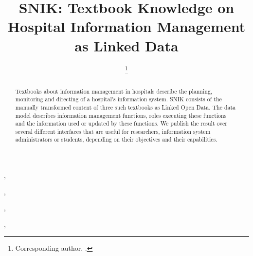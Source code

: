 \documentclass[sw]{iosart2x}
\begin{document}
\begin{frontmatter}

\title{SNIK: Textbook Knowledge on Hospital Information Management as Linked Data}

\author[A]{ %
\thanks{Corresponding author. .}},
\author[A]{ },
\author[A]{ },
\author[A]{ },
\author[A]{ }
\address[A]{Institute for Medical Informatics, Statistics and Epidemiology (IMISE),
, }

\begin{abstract}
Textbooks about information management in hospitals describe the planning, monitoring and directing of a hospital's information system.
SNIK consists of the manually transformed content of three such textbooks as Linked Open Data.
The data model describes information management functions, roles executing these functions and the information used or updated by these functions.
We publish the result over several different interfaces that are useful for researchers, information system administrators or students, depending on their objectives and their capabilities.
\end{abstract}

\begin{keyword}
\end{keyword}

\end{frontmatter}
\end{document}
